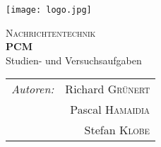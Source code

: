 \documentclass[12pt]{article}
\begin{document}
\begin{titlepage}

\newcommand{\HRule}{\rule{\linewidth}{0.5mm}} %

\center %


\noindent\begin{minipage}[t][0.3819660112501052\paperheight][t]{\textwidth}
\centering
\vspace{0.09016994374947421\paperheight}
\texttt{[image: logo.jpg]}
\end{minipage}

\textsc{\Large Nachrichtentechnik}\\[0.5cm] %


{ \huge \bfseries PCM}\\ %
\vspace{0.034441853748633004\paperheight}
\large Studien- und Versuchsaufgaben\\
\vspace{0.1458980337503154\paperheight}


  \begin{tabular}{lr}
    \emph{Autoren:} & Richard {\color{hsblue}\textsc{Grünert}}\\
     & Pascal {\color{hsblue}\textsc{Hamaidia}}\\
     & Stefan {\color{hsblue}\textsc{Klobe}}\\
   \end{tabular}\\[0.05572809000084118\paperheight]


\end{titlepage}
\end{document}
